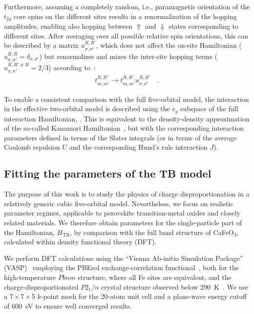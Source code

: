 \documentclass[aps,prb,twocolumn,superscriptaddress,10pt]{revtex4-1}
\newcommand{\pref}[1]{\prettyref{#1}}%
\newcommand{\eg}{\ensuremath{{e_g}}\xspace}
\newcommand{\ttg}{\ensuremath{{t_{2g}}}\xspace}
\newcommand{\Pton}{\ensuremath{P2_1/n}\xspace}
\begin{document}
Furthermore, assuming a completely random, i.e., paramagnetic orientation of the \ttg core spins on the different sites results in a renormalization of the hopping amplitudes, enabling also hopping between $\Uparrow$ and $\Downarrow$ states corresponding to different sites.
After averaging over all possible relative spin orientations, this can be described by a matrix $u^{R, R'}_{\sigma, \sigma'}$, which does not affect the on-site Hamiltonian ($u^{R, R}_{\sigma, \sigma'} = \delta_{\sigma, \sigma'}$) but renormalizes and mixes the inter-site hopping terms ($u^{R, R'\neq R}_{\sigma, \sigma'} = 2/3$) according to~\cite{ahn_effects_2000,pavarini_origin_2010}:
\begin{align}
    t^{R, R'}_{m, m'} \rightarrow t^{R, R'}_{m, m'} u^{R, R'}_{\sigma, \sigma'} \quad .
\end{align}

To enable a consistent comparison with the full five-orbital model, the interaction in the effective two-orbital model is described using the \eg subspace of the full interaction Hamiltonian,  \pref{eq:hint}. This is equivalent to the density-density approximation of the so-called Kanamori Hamiltonian~\cite{kanamori_electron_1963}, but with the corresponding interaction parameters defined in terms of the Slater integrals (or in terms of the average Coulomb repulsion $U$ and the corresponding Hund's rule interaction $J$). 

\subsection{Fitting the parameters of the TB model}
\label{sec:fitting}

The purpose of this work is to study the physics of charge disproportionation in a relatively generic cubic five-orbital model. Nevertheless, we focus on realistic parameter regimes, applicable to perovskite transition-metal oxides and closely related materials. We therefore obtain parameters for the single-particle part of the Hamiltonian, $H_\text{TB}$, by comparison with the full band structure of CaFeO$_3$, calculated within density functional theory (DFT).

We perform DFT calculations using the ``Vienna Ab-initio Simulation Package'' (VASP)~\cite{kresse_ab_1993, kresse_efficient_1996} employing the PBEsol exchange-correlation functional~\cite{perdew_restoring_2008}, both for the high-temperature $Pbnm$ structure, where all Fe sites are equivalent, and the charge-disproportionated \Pton crystal structure observed below \SI{290}{K}~\cite{morimoto_structure_1996, takeda_metalsemiconductor_2000}. 
We use a $7 \times 7 \times 5$ $k$-point mesh for the 20-atom unit cell and a plane-wave energy cutoff of \SI{600}{eV} to ensure well converged results.
\end{document}
